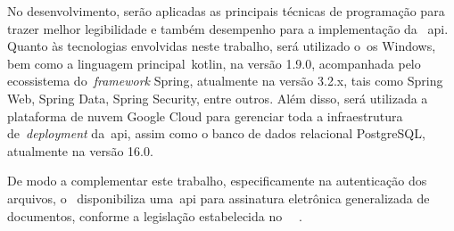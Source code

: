 No desenvolvimento, serão aplicadas as principais técnicas de programação para
trazer melhor legibilidade e também desempenho para a implementação da
~\acrfull{api}.
Quanto às tecnologias envolvidas neste trabalho, será utilizado o~\acrfull{os}
Windows, bem como a linguagem principal~\acrfull{kotlin}, na versão 1.9.0,
acompanhada pelo ecossistema do~\textit{framework} Spring, atualmente na versão
3.2.x, tais como Spring Web, Spring Data, Spring Security, entre outros.
Além disso, será utilizada a plataforma de nuvem Google Cloud para gerenciar
toda a infraestrutura de~\textit{deployment} da~\acrshort{api}, assim como o
banco de dados relacional PostgreSQL, atualmente na versão 16.0.

De modo a complementar este trabalho, especificamente na autenticação dos arquivos,
o~\citeauthor*{govbr2020} disponibiliza uma~\acrshort{api} para assinatura eletrônica
generalizada de documentos, conforme a legislação estabelecida no
~~\cite{govbr2020}.
